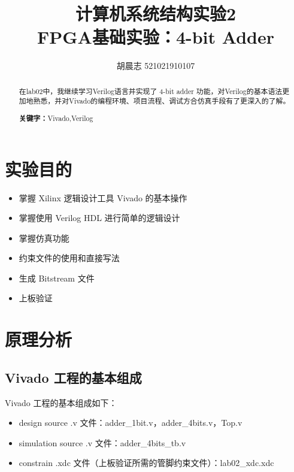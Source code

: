 \documentclass{progartcn}
\title{\bfseries\sffamily
  计算机系统结构实验2 \\ FPGA基础实验：4-bit Adder
}
\author{胡晨志 521021910107}
\date{}
\begin{document}
\sloppy %


\maketitle
\thispagestyle{empty}

\begin{abstract}
\noindent 在lab02中，我继续学习Verilog语言并实现了 4-bit adder 功能，对Verilog的基本语法更加地熟悉，并对Vivado的编程环境、项目流程、调试方合仿真手段有了更深入的了解。

\vspace{2ex}
\noindent \textbf{关键字：}Vivado,\hspace{.5em}Verilog
\end{abstract}

\tableofcontents

\setcounter{page}{0}
\newpage

\section{实验目的}

\begin{itemize}
  \item 掌握 Xilinx 逻辑设计工具 Vivado 的基本操作
  \item 掌握使用 Verilog HDL 进行简单的逻辑设计
  \item 掌握仿真功能
  \item 约束文件的使用和直接写法
  \item 生成 Bitstream 文件
  \item 上板验证
\end{itemize}

\section{原理分析}

\subsection{Vivado 工程的基本组成}

Vivado 工程的基本组成如下：

\begin{itemize}
  \item design source .v 文件：adder\_1bit.v，adder\_4bits.v，Top.v
  \item simulation source .v 文件：adder\_4bits\_tb.v
  \item constrain .xdc 文件（上板验证所需的管脚约束文件）：lab02\_xdc.xdc
\end{itemize}
\end{document}
